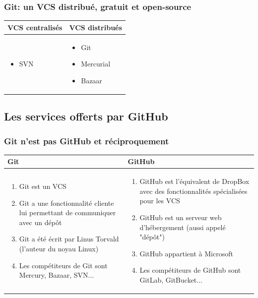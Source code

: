 \documentclass{beamer}
\begin{document}
\begin{frame}
\frametitle{Git: un VCS distribué, gratuit et open-source}
\begin{tabular}{ | m{12em} | m{12em} | }
    \hline
    
    \textbf{VCS centralisés} & \textbf{VCS distribués}\\
        
    \hline
    
    \begin{itemize}
    \item SVN
    \end{itemize}
    
    & 
    
    \begin{itemize}
    \item Git
    \item Mercurial
    \item Bazaar
    \end{itemize} \\
    
    \hline
\end{tabular}
\end{frame}


\subsection{Les services offerts par GitHub}
\begin{frame}
\frametitle{Git n'est pas GitHub et réciproquement}
\begin{tabular}{ | m{13em} | m{13em} | }
    \hline
    
    \textbf{Git} & \textbf{GitHub}\\
        
    \hline
    
    \begin{enumerate}
        \item Git est un VCS
        \item Git a une fonctionnalité cliente lui permettant de communiquer avec un dépôt
        \item Git a été écrit par Linus Torvald (l'auteur du noyau Linux)
        \item Les compétiteurs de Git sont Mercury, Bazaar, SVN...
    \end{enumerate}
    & 
    
    \begin{enumerate}
    \item GitHub est l'équivalent de DropBox avec des fonctionnalités spécialisées pour les VCS
    \item GitHub est un serveur web d'hébergement (aussi appelé "dépôt")
    \item GitHub appartient à Microsoft
    \item Les compétiteurs de GitHub sont GitLab, GitBucket...
    \end{enumerate} \\
    
    \hline
\end{tabular}

\end{frame}
\end{document}
